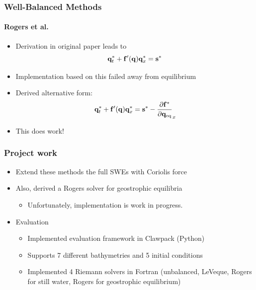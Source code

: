\documentclass[handout]{beamer}
\begin{document}
\begin{frame}
  \frametitle{Well-Balanced Methods}
  \framesubtitle{Rogers et al.}
  \begin{itemize}
    \item Derivation in original paper leads to
    \begin{equation}
      \vb q^*_t + \vb f'(\vb q) \vb q^*_x = \vb s^*
    \end{equation}
    \item Implementation based on this failed away from equilibrium
    \pause
    \item Derived alternative form:
    \begin{equation}
      \vb q^*_t + \vb f'(\vb q) \vb q^*_x = \vb s^* - \pdv{\vb f^*}{\vb q_\mathrm{eq}} (\vb q_\mathrm{eq})_x
    \end{equation}
    \item This does work!
  \end{itemize}
\end{frame}

\begin{frame}
  \frametitle{Project work}
  \begin{itemize}
    \item Extend these methods the full SWEs with Coriolis force
    \pause
    \item Also, derived a Rogers solver for geostrophic equilibria
    \begin{itemize}
      \item Unfortunately, implementation is work in progress.
    \end{itemize}
    \pause
    \item Evaluation
    \begin{itemize}
      \item Implemented evaluation framework in Clawpack (Python)
      \item Supports 7 different bathymetries and 5 initial conditions
      \item Implemented 4 Riemann solvers in Fortran (unbalanced, LeVeque, Rogers for still water, Rogers for geostrophic equilibrium)
    \end{itemize}
  \end{itemize}
\end{frame}
\end{document}
